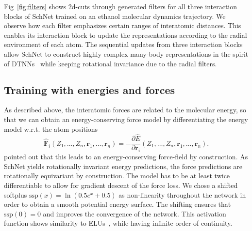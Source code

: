 \documentclass{article}
\newcommand{\rr}{\mathbf{r}}
\begin{document}
Fig~\ref{fig:filters} shows 2d-cuts through generated filters for all three interaction blocks of SchNet trained on an ethanol molecular dynamics trajectory.
We observe how each filter emphasizes certain ranges of interatomic distances.
This enables its interaction block to update the representations according to the radial environment of each atom.
The sequential updates from three interaction blocks allow SchNet to construct highly complex many-body representations in the spirit of DTNNs~\citep{schutt2017quantum} while keeping rotational invariance due to the radial filters.


\subsection{Training with energies and forces}
As described above, the interatomic forces are related to the molecular energy, so that we can obtain an energy-conserving force model by differentiating the energy model w.r.t. the atom positions
\begin{equation}
\hat{\textbf{F}}_i(Z_1, \dots, Z_n, \rr_1, \dots, \rr_n) = -\frac{\partial \hat{E}}{\partial \rr_i}(Z_1, \dots, Z_n, \rr_1, \dots, \rr_n).
\end{equation}
\citet{chmiela2017machine} pointed out that this leads to an energy-conserving force-field by construction.
As SchNet yields rotationally invariant energy predictions, the force predictions are rotationally equivariant by construction.
The model has to be at least twice differentiable to allow for gradient descent of the force loss.
We chose a shifted softplus $\text{ssp}(x) = \ln(0.5e^x + 0.5)$ as non-linearity throughout the network in order to obtain a smooth potential energy surface.
The shifting ensures that $\text{ssp}(0) = 0$ and improves the convergence of the network.
This activation function shows similarity to ELUs~\citep{clevert2015fast}, while having infinite order of continuity.
\end{document}
